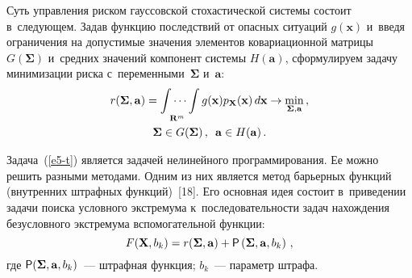 \begin{multicols}{2}
  
  Суть управ\-ле\-ния риском гауссовской стохастической сис\-те\-мы со\-сто\-ит 
в~сле\-ду\-ющем. Задав функцию по\-след\-ст\-вий от опасных ситуаций 
$g(\mathbf{x})$ и~введя ограничения на допустимые значения элементов 
ковариационной мат\-ри\-цы $G(\boldsymbol{\Sigma})$ и~сред\-них значений 
компонент сис\-те\-мы $H(\mathbf{a})$, сформулируем задачу минимизации рис\-ка 
с~переменными~$\boldsymbol{\Sigma}$ и~$\mathbf{a}$:
  \begin{multline}
    r(\boldsymbol{\Sigma}, \mathbf{a})=\displaystyle \idotsint\limits_{\mathbf{R}^m} 
g(\mathbf{x}) p_{\mathbf{X}}(\mathbf{x})\,d\mathbf{x} \to 
\min\limits_{\boldsymbol{\Sigma}, \mathbf{a}}\,,\\
\boldsymbol{\Sigma} \in G(\boldsymbol{\Sigma})\,,\enskip \mathbf{a}\in 
H(\mathbf{a})\,.
    \label{e5-t}
  \end{multline}
  
  Задача~(\ref{e5-t}) является задачей нелинейного про\-грам\-ми\-ро\-ва\-ния. Ее 
мож\-но решить разными методами. Одним из них является метод барьерных 
функ\-ций (внут\-рен\-них штраф\-ных функ\-ций)~[18]. Его основная идея со\-сто\-ит 
в~приведении задачи поиска услов\-но\-го экстремума к~по\-сле\-до\-ва\-тель\-ности задач 
на\-хож\-де\-ния без\-услов\-но\-го экстремума вспомогательной функции:
  $$
  F(\mathbf{X}, b_k) =r(\boldsymbol{\Sigma}, \mathbf{a}) 
+{\sf P}\left(\boldsymbol{\Sigma}, \mathbf{a}, b_k\right)\,,
  $$
где ${\sf P}(\boldsymbol{\Sigma}, \mathbf{a}, b_k)$~--- штраф\-ная функ\-ция; $b_k$~--- 
па\-ра\-метр штрафа.

\pagebreak
  
  
 \end{multicols}
 
  \begin{figure*} %
  \vspace*{1pt}
 \begin{center}
 \mbox{%
 \epsfxsize=164.954mm 
 }
 \end{center}
\vspace*{-4pt}
\vspace*{12pt}
\end{figure*}
  
